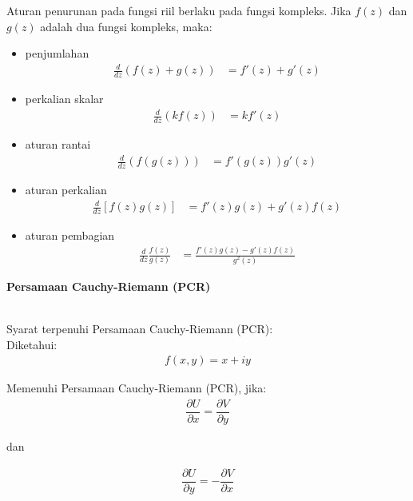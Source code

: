 \documentclass{article}
\begin{document}
\newpage
Aturan penurunan pada fungsi riil berlaku pada fungsi kompleks. Jika $f(z)$ dan $g(z)$ adalah dua fungsi kompleks, maka:
\begin{itemize}
    \item penjumlahan
          \begin{align}
              \frac{d}{dz}(f(z)+g(z)) & = f'(z) + g'(z)
          \end{align}
    \item perkalian skalar
          \begin{align}
              \frac{d}{dz}(kf(z)) & = kf'(z)
          \end{align}
    \item aturan rantai
          \begin{align}
              \frac{d}{dz}(f(g(z))) & = f'(g(z)) g'(z)
          \end{align}
    \item aturan perkalian
          \begin{align}
              \frac{d}{dz}[f(z)g(z)] & = f'(z)g(z) + g'(z)f(z)
          \end{align}
    \item aturan pembagian
          \begin{align}
              \frac{d}{dz}\frac{f(z)}{g(z)} & = \frac{f'(z)g(z) - g'(z)f(z)}{g^2(z)}
          \end{align}
\end{itemize}


\newpage
\begin{center}
    \textbf{Persamaan Cauchy-Riemann (PCR)}
\end{center}
\leavevmode\\

Syarat terpenuhi Persamaan Cauchy-Riemann (PCR):\\

Diketahui:
\begin{align}
    f(x,y) = x + iy
    \nonumber
\end{align}

Memenuhi Persamaan Cauchy-Riemann (PCR), jika:
\begin{align}
    \dfrac{\partial U}{\partial x} = \dfrac{\partial V}{\partial y}
\end{align}
\begin{center}
    dan
\end{center}
\begin{align}
    \dfrac{\partial U}{\partial y} = -\dfrac{\partial V}{\partial x}
\end{align}
\end{document}
